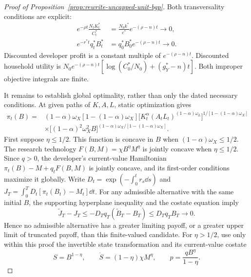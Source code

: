 \begin{proof}[Proof of Proposition~\ref{prop:rewrite-uncapped-unit-bgp}]
Both transversality conditions are explicit:
\begin{align}
 e^{-\rho t}\frac{N_tK_t^*}{C_t^*}
 &=\frac{N_0k^*}{c^*}e^{-(\rho-n)t}\longrightarrow0,
 \label{eq:rewrite-uncapped-unit-household-tvc}\\
 e^{-r^*t}q_t^*B_t^*
 &=q_0^*B_0^*e^{-(\rho-n)t}\longrightarrow0.
 \label{eq:rewrite-uncapped-unit-developer-tvc}
\end{align}
Discounted developer profit is a constant multiple of
$e^{-(\rho-n)t}$. Discounted household utility is
$N_0e^{-(\rho-n)t}[\log(C_0^*/N_0)+(g_Y^*-n)t]$.
Both improper objective integrals are finite.

It remains to establish global optimality, rather than only the dated
necessary conditions. At given paths of $K,A,L$, static optimization gives
\begin{equation}
 \begin{split}
 \pi_t(B)={}&(1-\alpha)\omega_X[1-(1-\alpha)\omega_X]
 \bigl[K_t^\alpha(A_tL_t)^{(1-\alpha)\omega_L}\bigr]^{1/[1-(1-\alpha)\omega_X]}\\
 &\times\bigl[(1-\alpha)^2\omega_X^2B\bigr]^{(1-\alpha)\omega_X/[1-(1-\alpha)\omega_X]}.
 \end{split}
 \label{eq:rewrite-uncapped-unit-profit}
\end{equation}
First suppose $\eta\leq1/2$.
This function is concave in $B$ when $(1-\alpha)\omega_X\leq1/2$.
The research technology $F(B,M)=\chi B^\eta M^\eta$ is jointly concave
when $\eta\leq1/2$. Since $q>0$, the developer's current-value Hamiltonian
$\pi_t(B)-M+q_tF(B,M)$ is jointly concave, and its first-order conditions
maximize it globally. Write $D_t=\exp(-\int_0^t r_s\dd s)$ and
$J_T=\int_0^T D_t[\pi_t(B_t)-M_t]\dd t$.
For any admissible alternative with the same initial $B$, the supporting
hyperplane inequality and the costate equation imply
\begin{equation}
 \widetilde J_T-J_T
 \leq-D_Tq_T(\widetilde B_T-B_T)
 \leq D_Tq_TB_T\longrightarrow0.
 \label{eq:rewrite-uncapped-unit-developer-verification}
\end{equation}
Hence no admissible alternative has a greater limiting payoff, or a
greater upper limit of truncated payoff, than this finite-valued candidate.
For $\eta>1/2$, use only within this proof the invertible state transformation
and its current-value costate
\begin{equation}
 S=B^{1-\eta},\qquad
 \dot S=(1-\eta)\chi M^\eta,\qquad
 p=\frac{qB^\eta}{1-\eta}.
 \label{eq:rewrite-uncapped-unit-transformed-state}
\end{equation}

\end{proof}
